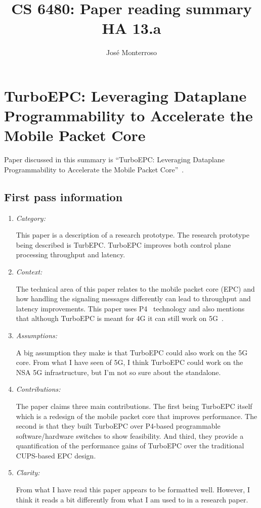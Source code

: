 \documentclass[letterpaper,twocolumn,10pt]{article}
\title{CS 6480: Paper reading summary\\
HA 13.a\\}
\author{José Monterroso}
\affil{School of Computing, University of Utah}
\begin{document}
\maketitle
\section{TurboEPC: Leveraging Dataplane Programmability to Accelerate the Mobile Packet Core}

Paper discussed in this summary is ``TurboEPC: Leveraging Dataplane Programmability to Accelerate the Mobile
Packet Core''~\cite{turboepc}.

\subsection{First pass information}
\label{sec:first}
\begin{enumerate}

\item {\it Category:}
 
This paper is a description of a research prototype. The research prototype being described is TurbEPC. TurboEPC 
improves both control plane processing throughput and latency. 

\item {\it Context:} 

The technical area of this paper relates to the mobile packet core (EPC) and how handling the signaling messages
differently can lead to throughput and latency improvements. This paper uses P4~\cite{p4} technology and also 
mentions that although TurboEPC is meant for 4G it can still work on 5G~\cite{5gwhite}. 

\item {\it Assumptions:}  

A big assumption they make is that TurboEPC could also work on the 5G core. From what I have seen of 5G, I
think TurboEPC could work on the NSA 5G infrastructure, but I'm not so sure about the standalone. 

\item {\it Contributions:}

The paper claims three main contributions. The first being TurboEPC itself which is a redesign of the mobile 
packet core that improves performance. The second is that they built TurboEPC over P4-based programmable
software/hardware switches to show feasibility. And third, they provide a quantification of the performance gains
of TurboEPC over the traditional CUPS-based EPC design. 

\item {\it Clarity:} 

From what I have read this paper appears to be formatted well. However, I think it reads a bit
differently from what I am used to in a research paper. 

\end{enumerate}
\end{document}
